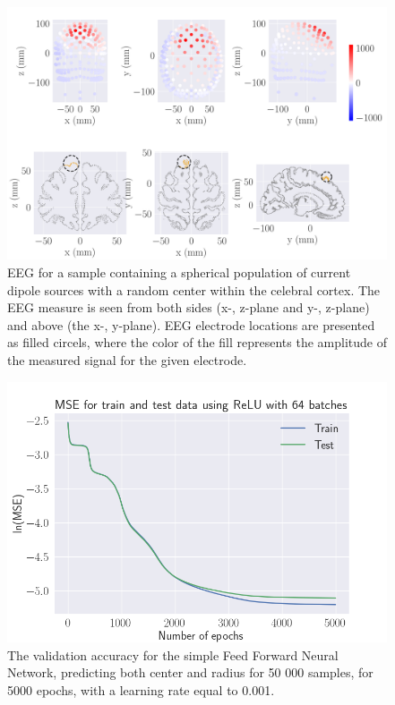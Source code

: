 \documentclass[a4paper, UKenglish, 11pt]{uiomaster}
\begin{document}

\begin{figure}[!htb]
    \centering
    \includegraphics[width=\linewidth]{figures/dipole_area_reduced_0.pdf}
    \caption{EEG for a sample containing a spherical population of current dipole sources with a random center within the celebral cortex. The EEG measure is seen from both sides (x-, z-plane and y-, z-plane) and above (the x-, y-plane). EEG electrode locations are presented as filled circels, where the color of the fill represents the amplitude of the measured signal for the given electrode.}
    \label{fig:dipole_area}
\end{figure}

\begin{figure}[!htb]
    \centering
    \includegraphics[width=\linewidth]{figures/MSE_50000_26junemseloss_MSE_area_w_amplitude_5000_SGD_lr0.001_wd0.1_mom0.35_bs64_ReLU_64_5000_N_dipoles_1.png}
    \caption{The validation accuracy for the simple Feed Forward Neural Network, predicting both center and radius for 50 000 samples, for 5000 epochs, with a learning rate equal to 0.001.}
    \label{fig:dipole_area_result}
\end{figure}
\end{document}
